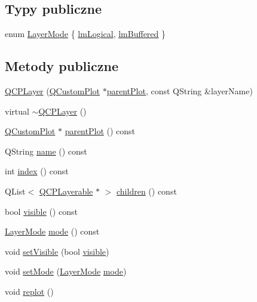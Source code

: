 \subsection*{Typy publiczne}
\begin{DoxyCompactItemize}
\item 
enum \hyperlink{class_q_c_p_layer_a67dcfc1590be2a1f2227c5a39bb59c7c}{Layer\+Mode} \{ \hyperlink{class_q_c_p_layer_a67dcfc1590be2a1f2227c5a39bb59c7ca02eb5e9a4cb7f1baf1e2b6b99e3b87ce}{lm\+Logical}, 
\hyperlink{class_q_c_p_layer_a67dcfc1590be2a1f2227c5a39bb59c7cab581b9fab3007c4c65f057f4185d7538}{lm\+Buffered}
 \}
\end{DoxyCompactItemize}
\subsection*{Metody publiczne}
\begin{DoxyCompactItemize}
\item 
\hyperlink{class_q_c_p_layer_a5d0657fc86d624e5efbe930ef21af718}{Q\+C\+P\+Layer} (\hyperlink{class_q_custom_plot}{Q\+Custom\+Plot} $\ast$\hyperlink{class_q_c_p_layer_a3958c9a938c2d05a7378c41484acee08}{parent\+Plot}, const Q\+String \&layer\+Name)
\item 
virtual \hyperlink{class_q_c_p_layer_afc1a8940f8e34c9f25ead9dfd4828cae}{$\sim$\+Q\+C\+P\+Layer} ()
\item 
\hyperlink{class_q_custom_plot}{Q\+Custom\+Plot} $\ast$ \hyperlink{class_q_c_p_layer_a3958c9a938c2d05a7378c41484acee08}{parent\+Plot} () const 
\item 
Q\+String \hyperlink{class_q_c_p_layer_a96ebd1e436f3813938cb9cd4a59a60be}{name} () const 
\item 
int \hyperlink{class_q_c_p_layer_ad5d7010829a6b99f326b07d7e37c8c99}{index} () const 
\item 
Q\+List$<$ \hyperlink{class_q_c_p_layerable}{Q\+C\+P\+Layerable} $\ast$ $>$ \hyperlink{class_q_c_p_layer_a94c2f0100e48cefad2de8fe0fbb03c27}{children} () const 
\item 
bool \hyperlink{class_q_c_p_layer_a9efca636e4dcad721999a6282f296016}{visible} () const 
\item 
\hyperlink{class_q_c_p_layer_a67dcfc1590be2a1f2227c5a39bb59c7c}{Layer\+Mode} \hyperlink{class_q_c_p_layer_ae93755983003f89e5331bc91598a772e}{mode} () const 
\item 
void \hyperlink{class_q_c_p_layer_ac07671f74edf6884b51a82afb2c19516}{set\+Visible} (bool \hyperlink{class_q_c_p_layer_a9efca636e4dcad721999a6282f296016}{visible})
\item 
void \hyperlink{class_q_c_p_layer_a938d57b04f4e4c23cedf1711f983919b}{set\+Mode} (\hyperlink{class_q_c_p_layer_a67dcfc1590be2a1f2227c5a39bb59c7c}{Layer\+Mode} \hyperlink{class_q_c_p_layer_ae93755983003f89e5331bc91598a772e}{mode})
\item 
void \hyperlink{class_q_c_p_layer_adefd53b6db02f470151c416f42e37180}{replot} ()
\end{DoxyCompactItemize}
